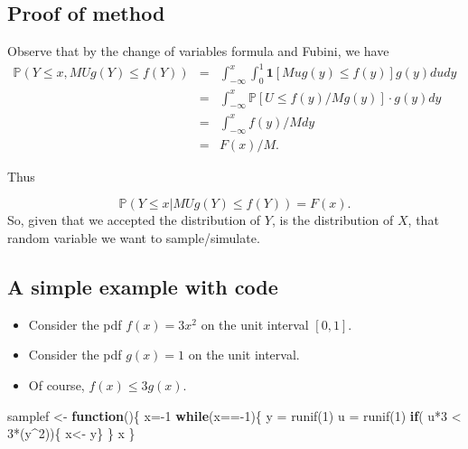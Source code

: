 \documentclass[
]{article}
\newenvironment{Shaded}{\begin{snugshade}}{\end{snugshade}}
\newcommand{\ControlFlowTok}[1]{\textcolor[rgb]{0.13,0.29,0.53}{\textbf{#1}}}
\newcommand{\DecValTok}[1]{\textcolor[rgb]{0.00,0.00,0.81}{#1}}
\newcommand{\FunctionTok}[1]{\textcolor[rgb]{0.00,0.00,0.00}{#1}}
\newcommand{\NormalTok}[1]{#1}
\newcommand{\OtherTok}[1]{\textcolor[rgb]{0.56,0.35,0.01}{#1}}
\newcommand{\SpecialCharTok}[1]{\textcolor[rgb]{0.00,0.00,0.00}{#1}}
\providecommand{\tightlist}{%
  \setlength{\itemsep}{0pt}\setlength{\parskip}{0pt}}
\theoremstyle{definition}
\theoremstyle{definition}
\theoremstyle{definition}
\theoremstyle{remark}
\begin{document}
\hypertarget{proof-of-method}{%
\subsection{Proof of method}\label{proof-of-method}}

Observe that by the change of variables formula and Fubini, we have
\begin{eqnarray*}
 \mathbb{P}(Y \leq x, MU g(Y) \leq f(Y)) 
&=& \int_{-\infty} ^x \int_0 ^1 \mathbf{1}[Mu g(y) \leq f(y)]g(y)dudy \\
&=&  \int_{-\infty} ^x  \mathbb{P}[U \leq f(y)/Mg(y)] \cdot g(y) dy \\
&=&  \int_{-\infty} ^x f(y)/M dy \\
&=&  F(x)/M.
\end{eqnarray*}

Thus

\[
\mathbb{P}(Y \leq x | MU g(Y) \leq f(Y)) = F(x).
\]
So, given that we accepted the distribution of \(Y\), is the distribution of \(X\), that random variable we want to sample/simulate.

\hypertarget{a-simple-example-with-code}{%
\subsection{A simple example with code}\label{a-simple-example-with-code}}

\begin{itemize}
\tightlist
\item
  Consider the pdf \(f(x) = 3x^2\) on the unit interval \([0,1]\).
\item
  Consider the pdf \(g(x) = 1\) on the unit interval.
\item
  Of course, \(f(x) \leq 3 g(x)\).
\end{itemize}

\begin{Shaded}
\begin{Highlighting}[]
\NormalTok{samplef }\OtherTok{\textless{}{-}} \ControlFlowTok{function}\NormalTok{()\{}
\NormalTok{x}\OtherTok{=}\SpecialCharTok{{-}}\DecValTok{1}
\ControlFlowTok{while}\NormalTok{(x}\SpecialCharTok{=={-}}\DecValTok{1}\NormalTok{)\{}
\NormalTok{y }\OtherTok{=} \FunctionTok{runif}\NormalTok{(}\DecValTok{1}\NormalTok{)}
\NormalTok{u }\OtherTok{=} \FunctionTok{runif}\NormalTok{(}\DecValTok{1}\NormalTok{)}
\ControlFlowTok{if}\NormalTok{( u}\SpecialCharTok{*}\DecValTok{3} \SpecialCharTok{\textless{}} \DecValTok{3}\SpecialCharTok{*}\NormalTok{(y}\SpecialCharTok{\^{}}\DecValTok{2}\NormalTok{))\{ x}\OtherTok{\textless{}{-}}\NormalTok{ y\}}
\NormalTok{\}}
\NormalTok{x}
\NormalTok{\}}
\end{Highlighting}
\end{Shaded}
\end{document}
